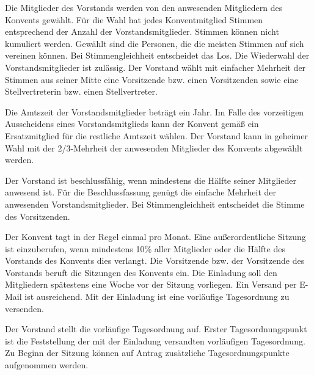 \documentclass[a4paper, parskip=half, numbers=noenddot]{scrartcl}
\begin{document}
\begin{contract}
\label{wahl}
Die Mitglieder des Vorstands werden von den anwesenden Mitgliedern des Konvents gewählt. Für
die Wahl hat jedes Konventmitglied Stimmen entsprechend der Anzahl der Vorstandsmitglieder. Stimmen können nicht kumuliert werden.
Gewählt sind die Personen, die die meisten Stimmen auf sich vereinen können. Bei Stimmengleichheit entscheidet das Los. Die Wiederwahl der Vorstandsmitglieder ist zulässig.
Der Vorstand wählt mit einfacher Mehrheit der Stimmen aus seiner Mitte eine Vorsitzende bzw.
einen Vorsitzenden sowie eine Stellvertreterin bzw. einen Stellvertreter.


Die Amtszeit der Vorstandsmitglieder beträgt ein Jahr. Im Falle des vorzeitigen Ausscheidens
eines Vorstandsmitglieds kann der Konvent gemäß  ein Ersatzmitglied für die restliche Amtszeit wählen. Der Vorstand kann in geheimer Wahl mit der 2/3-Mehrheit der anwesenden Mitglieder des Konvents abgewählt werden.

Der Vorstand ist beschlussfähig, wenn mindestens die Hälfte seiner Mitglieder anwesend ist. Für die Beschlussfassung genügt die einfache Mehrheit der anwesenden Vorstandsmitglieder. Bei Stimmengleichheit entscheidet die Stimme des Vorsitzenden.


Der Konvent tagt in der Regel einmal pro Monat.
Eine außerordentliche Sitzung ist einzuberufen, wenn mindestens 10\% aller Mitglieder oder die Hälfte des Vorstands des Konvents dies verlangt.
Die Vorsitzende bzw. der Vorsitzende des Vorstands beruft die Sitzungen des Konvents ein.
Die Einladung soll den Mitgliedern spätestens eine Woche vor der Sitzung vorliegen. Ein Versand per E-Mail ist ausreichend. Mit der Einladung ist eine vorläufige Tagesordnung zu versenden.

Der Vorstand stellt die vorläufige Tagesordnung auf. Erster Tagesordnungspunkt ist die Feststellung der mit der Einladung versandten vorläufigen Tagesordnung. Zu Beginn der Sitzung können auf Antrag zusätzliche Tagesordnungspunkte aufgenommen werden.


\end{contract}
\end{document}

